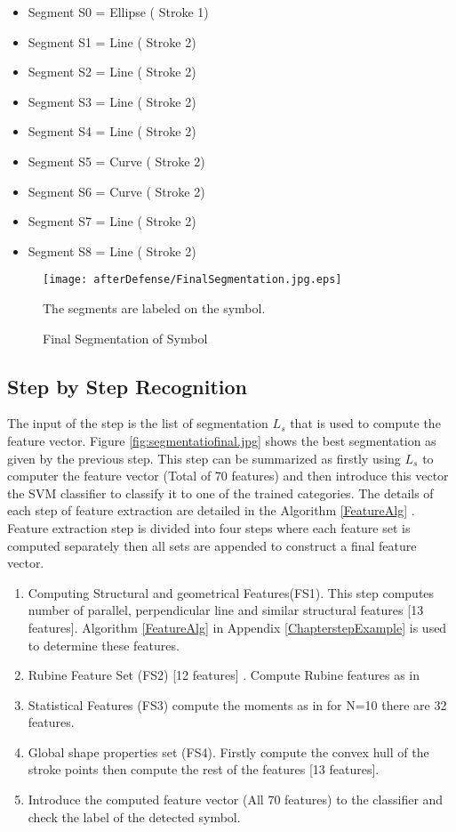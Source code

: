 \begin{itemize}
	\item    Segment S0  = Ellipse ( Stroke 1)
   \item Segment S1  =   Line ( Stroke 2)
     \item  Segment S2 = Line ( Stroke 2)
     \item  Segment S3  =  Line ( Stroke 2)
     \item Segment S4  =   Line ( Stroke 2)
  \item    Segment S5  =  Curve  ( Stroke 2)
     \item  Segment S6  =  Curve  ( Stroke 2)
     \item  Segment S7  =  Line   ( Stroke 2)
     \item  Segment S8  =  Line   ( Stroke 2)
\end{itemize}
\begin{figure}
	\centering
 		\texttt{[image: afterDefense/FinalSegmentation.jpg.eps]}
 
		\label{fig:FinalSegmentationLabeled}
	\caption{Final Segmentation of Symbol} The segments are labeled on the symbol. 
\end{figure}

\subsection{Step by Step Recognition}
\label{sec:steprec}

	The input of the step is the list of segmentation $L_s$ that is used to compute the feature vector. Figure \ref{fig:segmentatiofinal.jpg} shows the best segmentation as given by the previous step. This step can be summarized as firstly using $L_s$ to computer the feature vector (Total of 70 features) and then introduce this vector the SVM classifier to classify it to one of the trained categories. The details of each step of feature extraction are detailed in the Algorithm \ref{FeatureAlg} . Feature extraction step is divided into four steps where each feature set is computed separately then all sets are appended to construct a final feature vector. 
	
	
\begin{enumerate}
	\item Computing Structural and geometrical Features(FS1). This step computes number of parallel, perpendicular line and similar structural features [13 features]. Algorithm \ref{FeatureAlg} in Appendix \ref{ChapterstepExample}  is used to determine these features.
 	\item Rubine Feature Set (FS2) [12 features] .  Compute Rubine features as in \cite{gestureexample12} 
	\item Statistical Features (FS3) compute the moments as in \cite{zernike61} for N=10 there are 32 features.
	\item Global shape properties set (FS4). Firstly compute the convex hull of the stroke points then compute the rest of the features [13 features]. 
	\item Introduce the computed feature vector (All 70 features) to the classifier and check the label of the detected symbol. 
\end{enumerate}

